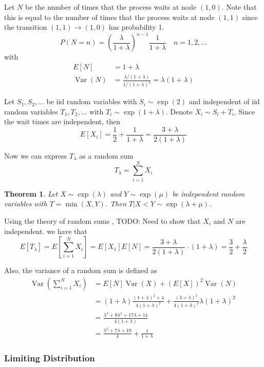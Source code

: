 \documentclass{article}
\theoremstyle{plain}
\newtheorem{theorem}{Theorem}[section]
\theoremstyle{definition}
\theoremstyle{remark}
\newcommand{\Var}{\operatorname {Var}}
\begin{document}
Let $N$ be the number of times that the process waits at node $(1,0)$.
Note that this is equal to the number of times that the process waits at node $(1,1)$ since the transition $(1,1) \to (1,0)$ has probability 1.
$$
P(N = n) = \left(\frac{\lambda}{1 + \lambda} \right)^{n - 1} \frac{1}{1 + \lambda} \quad n = 1,2,\ldots
$$
with
\begin{align*}
    E[N] &= 1 + \lambda\\
    \Var(N) &= \frac{\lambda/(1 + \lambda)}{1/(1 + \lambda)^2} = \lambda (1 + \lambda)
\end{align*}

Let $S_1, S_2, \ldots$ be iid random variables with
$S_i \sim \exp(2)$ and independent of iid random variables $T_1, T_2, \ldots$ with  $T_i \sim \exp(1 + \lambda)$.
Denote $X_i \sim S_i + T_i$, Since the wait times are independent, then 
$$
E[X_i] = \frac{1}{2} + \frac{1}{1 + \lambda} = \frac{3 + \lambda}{2(1 + \lambda)}
$$

Now we can express $T_\lambda$ as a random sum
$$
T_\lambda = \sum_{i = 1}^N X_i
$$

\begin{theorem}
Let $X \sim \exp(\lambda)$ and $Y \sim \exp(\mu)$ be independent random variables with $T = \min(X,Y)$.
Then $T | X < Y \sim \exp(\lambda + \mu)$.
\end{theorem}

Using the theory of random sums \cite{Ross97}, TODO: Need to show that $X_i$ and $N$ are independent. we have that
$$
E[T_\lambda] = E\left[ \sum_{i = 1}^N X_i \right] = E[X_1] E[N] = \frac{3 + \lambda}{2(1 + \lambda)} \cdot (1 + \lambda) = \frac{3}{2} + \frac{\lambda}{2}
$$

Also, the variance of a random sum is defined as
\begin{align*}
    \Var\left( \sum_{i = 1}^N X_i \right) &= E[N]\Var(X) + (E[X])^2 \Var(N)\\
    &= (1 + \lambda) \frac{(1 + \lambda)^2 + 4}{4(1 + \lambda)^2} + \frac{(3 + \lambda)^2}{4 (1 + \lambda)^2} \lambda (1 + \lambda)^2\\
    &= \frac{\lambda^3 + 8 \lambda^2 + 17 \lambda + 14}{4(1 + \lambda)}\\
    &= \frac{\lambda^2 + 7 \lambda + 10}{4} + \frac{1}{1 + \lambda}
\end{align*}

\subsubsection{Limiting Distribution}
\end{document}
